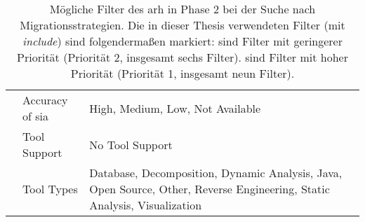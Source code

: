 \begin{table}
\begin{tabular}{m{2cm} m{2cm} m{9cm}}
    & Accuracy of \gls{sia} & High, Medium, Low, Not Available \\ \cline{2-3}
    & Tool Support & No Tool Support \\ \cline{2-3}
    & Tool Types & Database, Decomposition, Dynamic Analysis, Java, Open Source, Other, Reverse Engineering, Static Analysis, Visualization \\
    \bottomrule
  \end{tabular}
  \caption[Mögliche Filter des \acrshort{arh}]{
  	Mögliche Filter des \gls{arh} in Phase 2 bei der Suche nach Migrationsstrategien.
  	Die in dieser Thesis verwendeten Filter (mit \emph{include}) sind folgendermaßen markiert:
     sind Filter mit geringerer Priorität (Priorität 2, insgesamt sechs Filter).
     sind Filter mit hoher Priorität (Priorität 1, insgesamt neun Filter).
  }
  \label{tab:phase2-all-filter}
\end{table}
